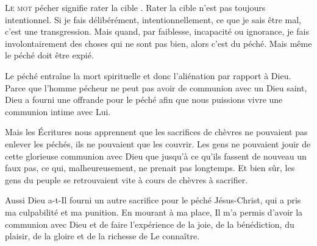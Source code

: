 \lettrine{L}{e mot} \Og pécher \Fg{} signifie \Og rater la cible \Fg{}.
 Rater la cible n'est pas toujours intentionnel.
 Si je fais délibérément, intentionnellement, ce que je sais être mal,
 c'est une transgression. Mais quand, par faiblesse, incapacité ou ignorance,
 je fais involontairement des choses qui ne sont pas bien, 
 alors c'est du péché. Mais même le péché doit être expié.


Le péché entraîne la mort spirituelle et donc l'aliénation par rapport à Dieu.
 Parce que l'homme pécheur ne peut pas avoir de communion avec un Dieu saint,
 Dieu a fourni une offrande pour le péché afin que nous puissions vivre
 une communion intime avec Lui.

Mais les Écritures nous apprennent que les sacrifices de chèvres
 ne pouvaient pas enlever les péchés, ils ne pouvaient que les couvrir.
 Les gens ne pouvaient jouir de cette glorieuse communion avec Dieu
 que jusqu'à ce qu'ils fassent de nouveau un faux pas, ce qui, malheureusement,
 ne prenait pas longtemps.
 Et bien sûr, les gens du peuple se retrouvaient vite
 à cours de chèvres à sacrifier.

Aussi Dieu a-t-Il fourni un autre sacrifice pour le péché\frcolon{} Jésus-Christ,
 qui a pris ma culpabilité et ma punition.
 En mourant à ma place, Il m'a permis d'avoir la communion avec Dieu
 et de faire l'expérience de la joie, de la bénédiction, du plaisir,
 de la gloire et de la richesse de Le connaître. 

\dvrule







